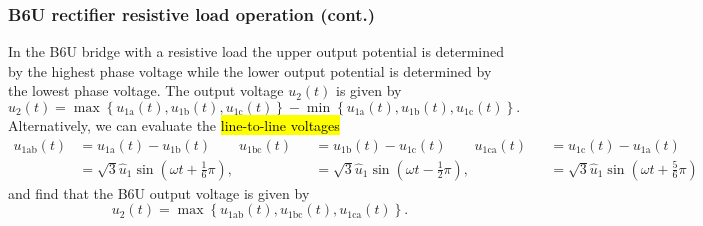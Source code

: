 \begin{frame}
    \frametitle{B6U rectifier resistive load operation (cont.)}
    In the B6U bridge with a resistive load the upper output potential is determined by the highest phase voltage while the lower output potential is determined by the lowest phase voltage. The output voltage $u_2(t)$ is given by
    \begin{equation}
        u_2(t) = \max\left\{u_{1\mathrm{a}}(t), u_{1\mathrm{b}}(t), u_{1\mathrm{c}}(t)\right\} - \min\left\{u_{1\mathrm{a}}(t), u_{1\mathrm{b}}(t), u_{1\mathrm{c}}(t)\right\}.
    \end{equation}
    \pause
    Alternatively, we can evaluate the \hl{line-to-line voltages}
    \begin{equation*}
        \begin{alignedat}{3}
        u_{1\mathrm{ab}}(t) &= u_{1\mathrm{a}}(t) - u_{1\mathrm{b}}(t) \qquad u_{1\mathrm{bc}}(t) &&= u_{1\mathrm{b}}(t) - u_{1\mathrm{c}}(t) \qquad u_{1\mathrm{ca}}(t) &&= u_{1\mathrm{c}}(t) - u_{1\mathrm{a}}(t)\\
                            &=\sqrt{3}\hat{u}_1\sin(\omega t + \frac{1}{6}\pi), &&= \sqrt{3}\hat{u}_1\sin(\omega t - \frac{1}{2}\pi), &&= \sqrt{3}\hat{u}_1\sin(\omega t + \frac{5}{6}\pi)
        \end{alignedat}
    \end{equation*}\pause
    and find that the B6U output voltage is given by
    \begin{equation}
        u_2(t) = \max\left\{u_{1\mathrm{ab}}(t), u_{1\mathrm{bc}}(t), u_{1\mathrm{ca}}(t)\right\}.
    \end{equation} 
\end{frame}

